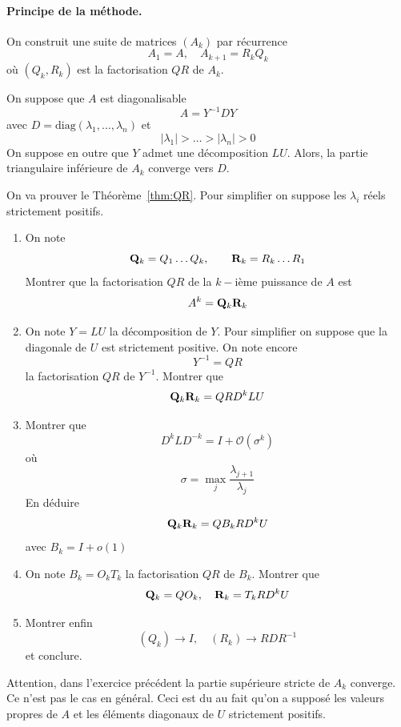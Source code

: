 \paragraph*{Principe de la méthode.} On construit une suite de matrices $(A_k)$ par récurrence
\[
A_1 = A, \quad A_{k+1} = R_k Q_k
\]
où $(Q_k,R_k)$ est la factorisation $QR$ de $A_k$.

\begin{theorem}
\label{thm:QR}
On suppose que $A$ est diagonalisable
\[
A = Y^{-1} D Y
\]
avec $D = \textrm{diag}(\lambda_1,\dots,\lambda_n)$
et
\[
|\lambda_1| > \dots > |\lambda_n| > 0
\]
On suppose en outre que $Y$ admet une décomposition $LU$. Alors, la partie triangulaire inférieure de $A_k$ converge vers $D$.
\end{theorem}

\begin{exercice}[long]
On va prouver le Théorème~\ref{thm:QR}. Pour simplifier on suppose les $\lambda_i$ réels strictement positifs. 
\begin{enumerate}
\item On note
\[
\mathbf{Q}_k = Q_1 \dots Q_k, \qquad \mathbf{R}_k = R_k \dots R_1
\]
Montrer que la factorisation $QR$ de la $k-$ième puissance de $A$ est 
\[
A^k = \mathbf{Q}_k \mathbf{R}_k
\]
\item On note $Y = LU$ la décomposition de $Y$. Pour simplifier on suppose que la diagonale de $U$ est strictement positive. On note encore
\[
Y^{-1} = QR
\]
la factorisation $QR$ de $Y^{-1}$. Montrer que 
\[
\mathbf{Q}_k \mathbf{R}_k = QR D^k L U
\]
\item Montrer que 
\[
D^k L D^{-k} = I +  \mathcal O \left(\sigma^k\right)
\]
où 
\[
\sigma = \max_j \frac{\lambda_{j+1}}{\lambda_j}
\]
En déduire
\[
\mathbf{Q}_k \mathbf{R}_k = QB_k R D^k U
\]
avec $B_k = I + o(1)$
\item On note $B_k = O_kT_k$ la factorisation $QR$ de $B_k$. Montrer que 
\[
\mathbf{Q}_k = Q O_k, \quad \mathbf{R}_k = T_k R D^k U
\]
\item Montrer enfin
\[
(Q_k) \rightarrow I, \quad (R_k) \rightarrow R D R^{-1}
\]
et conclure.
\end{enumerate}
\end{exercice}

\begin{remark}
Attention, dans l'exercice précédent la partie supérieure stricte de $A_k$ converge. Ce n'est pas le cas en général. Ceci est du au fait qu'on a supposé les valeurs propres de $A$ et les éléments diagonaux de $U$ strictement positifs. 
\end{remark}

